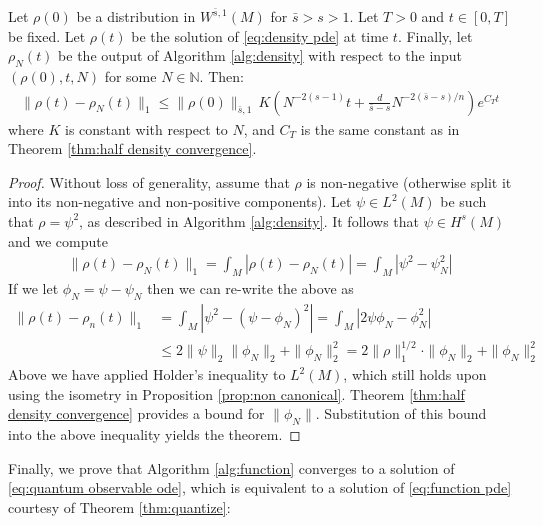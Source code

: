 \documentclass[final,leqno]{siamart}
\begin{document}
\begin{theorem} \label{thm:density convergence}
	Let $\rho(0)$ be a distribution in $W^{\bar{s},1}(M)$ for $\bar{s} > s >1$.
	Let $T > 0$ and $t \in [0,T]$ be fixed.
	Let $\rho(t)$ be the solution of \eqref{eq:density pde} at time $t$.
	Finally, let $\rho_{N}(t)$ be the output of Algorithm \ref{alg:density} with respect to the input $(\rho(0), t , N)$ for some $N \in \mathbb{N}$.
	Then:
	\begin{align}
		\| \rho(t) - \rho_{N}(t) \|_{1} \leq \| \rho(0) \|_{\bar{s},1} \, K \left( N^{-2(s-1)} t+  \frac{d}{\bar{s}-s} N^{-2(\bar{s}-s)/n} \right) e^{C_{T} t}
	\end{align}
	where $K$ is constant with respect to $N$, and $C_{T}$ is the same constant as in Theorem \ref{thm:half density convergence}.
\end{theorem}

\begin{proof}
	Without loss of generality, assume that $\rho$ is non-negative (otherwise split it into its non-negative and non-positive components).
	Let $\psi \in L^{2}(M)$ be such that $\rho =  \psi ^{2}$, as described in Algorithm \ref{alg:density}.
	It follows that $\psi \in H^{s}(M)$ and we compute
	\begin{align}
		\| \rho(t) - \rho_{N}(t) \|_{1} = \int_{M} | \rho(t) - \rho_{N}(t)| = \int_{M} | \psi^{2} - \psi_{N}^{2} |
	\end{align}
	If we let $\phi_{N} = \psi - \psi_{N}$ then we can re-write the above as
	\begin{align}
		\| \rho(t) - \rho_{n}(t) \|_{1}  &= \int_{M} | \psi^{2} - (\psi - \phi_{N})^{2} | = \int_{M} | 2 \psi \phi_{N} - \phi_{N}^{2} | \\
			&\leq 2 \| \psi \|_{2} \| \phi_{N}\|_{2} + \| \phi_{N} \|_{2}^{2} = 2 \| \rho \|_{1}^{1/2} \cdot \| \phi_{N} \|_{2} + \| \phi_{N} \|_{2}^{2}
	\end{align}
	Above we have applied Holder's inequality to $L^{2}(M)$, which still holds upon using the isometry in Proposition \ref{prop:non canonical}.
	Theorem \ref{thm:half density convergence} provides a bound for $\| \phi_{N} \|$.
	Substitution of this bound into the above inequality yields the theorem.
\end{proof}

Finally, we prove that Algorithm \ref{alg:function} converges to a solution of \eqref{eq:quantum observable ode}, which is equivalent to a solution of \eqref{eq:function pde} courtesy of Theorem \ref{thm:quantize}:
\end{document}
